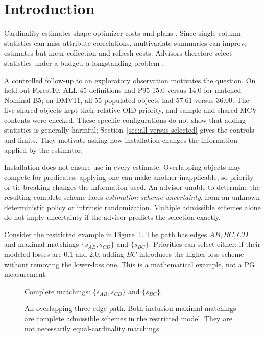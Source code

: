 \documentclass[sigconf, nonacm]{acmart}
\begin{document}
\section{Introduction}
\label{sec:intro}

Cardinality estimates shape optimizer costs and plans
\cite{leis2015optimizers,han2022benchmark}. Since single-column
statistics can miss attribute correlations, multivariate summaries
can improve estimates \cite{pg16stats} but incur collection and
refresh costs. Advisors therefore select statistics under a budget,
a longstanding problem \cite{chaudhuri2000stats,bruno2002sit,elhelw2009statadvisor}.

A controlled follow-up to an exploratory observation motivates the
question. On held-out Forest10, ALL 45 definitions had P95 15.0 versus
14.0 for matched Nominal B5; on DMV11, all 55 populated objects had
57.61 versus 36.00. The five shared objects kept their relative OID
priority, and sample and shared MCV contents were checked. These
specific configurations do not show that adding statistics is
generally harmful; Section~\ref{sec:all-versus-selected} gives the
controls and limits. They motivate asking how installation changes
the information applied by the estimator.

Installation does not ensure use in every estimate. Overlapping
objects may compete for predicates: applying one can make another
inapplicable, so priority or tie-breaking changes the information
used. An advisor unable to determine the resulting complete scheme
faces \emph{estimation-scheme uncertainty}, from an unknown
deterministic policy or intrinsic randomization. Multiple admissible
schemes alone do not imply uncertainty if the advisor predicts the
selection exactly.

Consider the restricted example in Figure~\ref{fig:path}.
The path has edges \(AB,BC,CD\) and maximal matchings
\(\{s_{AB},s_{CD}\}\) and \(\{s_{BC}\}\). Priorities can select
either; if their modeled losses are \(0.1\) and \(2.0\), adding
\(BC\) introduces the higher-loss scheme without removing the
lower-loss one. This is a mathematical example, not a PG measurement.

\begin{figure}[t]
\centering
{}
\smallskip
\par\small
Complete matchings: \(\{s_{AB},s_{CD}\}\) and \(\{s_{BC}\}\).
\caption{An overlapping three-edge path. Both inclusion-maximal
matchings are complete admissible schemes in the restricted model.
They are not necessarily equal-cardinality matchings.}
\label{fig:path}
\end{figure}
\end{document}
